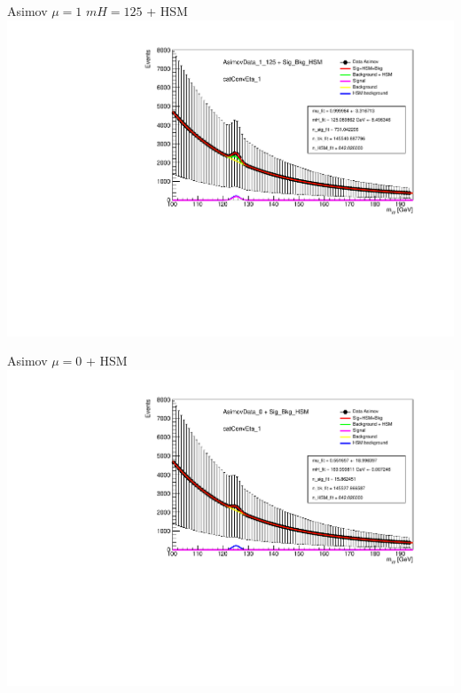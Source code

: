 \documentclass[10pt,UKenglish, leqno, xcolor = dvipsnames]{beamer}
\begin{document}
		\begin{frame}{Asimov $\mu=1$ $mH=125$ + HSM}
			\vfill
			\centering
			\includegraphics[width=\textwidth]{../images/week_14/HSM_AsimovData_1_125_catConvEta_1.pdf}
			\vfill
		\end{frame}
	
		\begin{frame}{Asimov $\mu=0$ + HSM}
			\vfill
			\centering
			\includegraphics[width=\textwidth]{../images/week_14/HSM_AsimovData_0_catConvEta_1_140.pdf}
			\vfill
		\end{frame}
	
\end{document}
